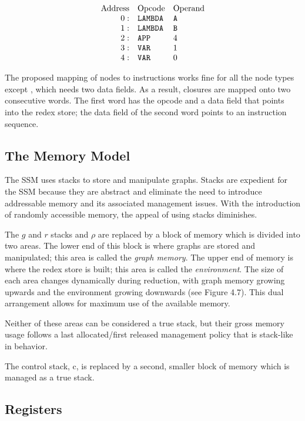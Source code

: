 \[
\begin{array}{rll}
\text{Address} & \text{Opcode} & \text{Operand}\\
0: & \texttt{LAMBDA} & \texttt{A}\\
1: & \texttt{LAMBDA} & \texttt{B}\\
2: & \texttt{APP} & 4\\
3: & \texttt{VAR} & 1\\
4: & \texttt{VAR} & 0
\end{array}
\]

The proposed mapping of nodes to instructions works fine for all the node types except
, which needs two data fields. As a result, closures are mapped onto
two consecutive words. The first word has the opcode  and a data field
that points into the redex store; the data field of the second word points to an
instruction sequence.

\subsection{The Memory Model}

The SSM uses stacks to store and manipulate graphs. Stacks are expedient for the SSM because they are abstract and eliminate the need to introduce addressable memory and its associated management issues. With the introduction of randomly accessible memory, the appeal of using stacks diminishes.

The \(g\) and \(r\) stacks and \(\rho\) are replaced by a block of memory which is divided into two areas. The lower end of this block is where graphs are stored and manipulated; this area is called the \emph{graph memory}. The upper end of memory is where the redex store is built; this area is called the \emph{environment}. The size of each area changes dynamically during reduction, with graph memory growing upwards and the environment growing downwards (see Figure 4.7). This dual arrangement allows for maximum use of the available memory.

Neither of these areas can be considered a true stack, but their gross memory usage follows a last allocated/first released management policy that is stack-like in behavior.

The control stack, c, is replaced by a second, smaller block of memory which is managed as a true stack.


\subsection{Registers}

